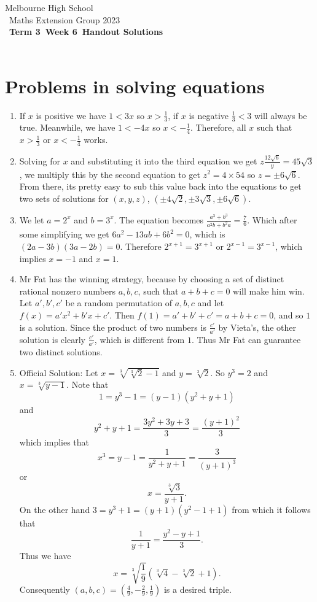 \documentclass[a4paper]{article}
\title{{\thepdftitle}}
\author{Nathan Wong\and Tom Yan}
\date{2023}
\newcommand{\theterm}{3}
\newcommand{\theweek}{6}
\newcommand{\thedisplaytitle}{Term \theterm\ Week \theweek\ Handout Solutions}
\begin{document}
\noindent Melbourne High School\\\
\noindent Maths Extension Group 2023\\\
\noindent \textbf{\thedisplaytitle}\\\
\section*{Problems in solving equations}
\begin{enumerate}
\item If $x$ is positive we have $1<3x$ so $x>\frac{1}{3}$, if $x$ is negative $\frac{1}{3}<3$ will always be true. Meanwhile, we have $1<-4x$ so $x<-\frac{1}{4}$. Therefore, all $x$ such that $x>\frac{1}{3}$ or $x<-\frac{1}{4}$ works.
\item Solving for $x$ and substituting it into the third equation we get $z\frac{12\sqrt{6}}{y}= 45\sqrt{3}$, we multiply this by the second equation to get $z^2=4\times 54$ so $z= \pm6\sqrt{6}$. From there, its pretty easy to sub this value back into the equations to get two sets of solutions for $(x,y,z)$, $(\pm 4\sqrt{2}, \pm 3\sqrt{3}, \pm 6\sqrt{6})$.
\item We let $a=2^x$ and $b=3^x$. The equation becomes $\frac{a^3+b^3}{a^2b+b^2a}=\frac{7}{6}$. Which after some simplifying we get $6a^2-13ab+6b^2=0$, which is $(2a-3b)(3a-2b)=0$. Therefore $2^{x+1}=3^{x+1}$ or $2^{x-1}=3^{x-1}$, which implies $x=-1$ and $x=1$. 
\item Mr Fat has the winning strategy, because by choosing a set of distinct rational nonzero numbers $a,b,c$, such that $a+b+c=0$ will make him win. Let $a', b', c'$ be a random permutation of $a,b,c$ and let $f(x)=a'x^2+b'x+c'$. Then $f(1)=a'+b'+c'=a+b+c=0$, and so $1$ is a solution. Since the product of two numbers is $\frac{c'}{a'}$ by Vieta's, the other solution is clearly $\frac{c'}{a'}$, which is different from $1$. Thus Mr Fat can guarantee two distinct solutions.    
\item Official Solution: Let $x=\sqrt[3]{\sqrt[3]{2}-1}$ and $y = \sqrt[3]{2}$. So $y^3=2$ and $x=\sqrt[3]{y-1}$. Note that $$1=y^3-1=(y-1)(y^2+y+1)$$ and $$y^2+y+1=\frac{3y^2+3y+3}{3}=\frac{(y+1)^2}{3}$$ which implies that $$x^3=y-1=\frac{1}{y^2+y+1}=\frac{3}{(y+1)^3}$$ or $$x=\frac{\sqrt[3]{3}}{y+1}.$$ On the other hand $3=y^3+1=(y+1)(y^2-1+1)$ from which it follows that $$\frac{1}{y+1}=\frac{y^2-y+1}{3}.$$ Thus we have $$x=\sqrt[3]{\frac{1}{9}}(\sqrt[3]{4}-\sqrt[3]{2}+1).$$ Consequently $(a,b,c) = (\frac{4}{9}, -\frac{2}{9}, \frac{1}{9})$ is a desired triple.
\end{enumerate}
\pagebreak
\end{document}
